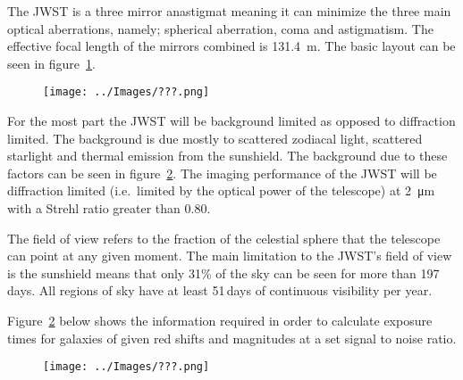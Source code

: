 	The JWST is a three mirror anastigmat meaning it can minimize the three main optical aberrations, namely; spherical aberration, coma and astigmatism. The effective focal length of the mirrors combined is \SI{131.4}{\metre}. The basic layout can be seen in figure~\ref{fig:james_web_layout}.
	\begin{figure}[!htb]
		\centering
			\texttt{[image: ../Images/???.png]}
		\caption{\label{fig:james_web_layout}}
	\end{figure}

	For the most part the JWST will be background limited as opposed to diffraction limited. The background is due mostly to scattered zodiacal light, scattered starlight and thermal emission from the sunshield. The background due to these factors can be seen in figure~\ref{fig:JW_exposure_times_for_galaxies}. The imaging performance of the JWST will be diffraction limited (i.e.\ limited by the optical power of the telescope) at \SI{2}{\micro\metre} with a Strehl ratio greater than 0.80.

	The field of view refers to the fraction of the celestial sphere that the telescope can point at any given moment. The main limitation to the JWST’s field of view is the sunshield means that only 31\% of the sky can be seen for more than 197\,days. All regions of sky have at least 51\,days of continuous visibility per year.

	Figure~\ref{fig:JW_exposure_times_for_galaxies} below shows the information required in order to calculate exposure times for galaxies of given red shifts and magnitudes at a set signal to noise ratio.
	\begin{figure}[!htb]
		\centering
			\texttt{[image: ../Images/???.png]}
		\caption{\label{fig:JW_exposure_times_for_galaxies}}
	\end{figure}
